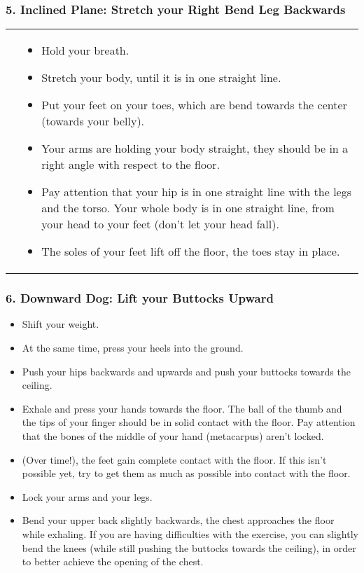 \documentclass[../Book.Stress_regulation.tex]{subfiles}
\begin{document}
\subsubsection{5. Inclined Plane: Stretch your Right Bend Leg Backwards}
\begin{tabular}{p{5.5cm} p{6cm} }
  \raisebox{-1.1\totalheight}{\texttt{[image: SS\_Plank]}}
  &

\begin{itemize}
\item Hold your breath.
\item Stretch your body, until it is in one straight line.
\item Put your feet on your toes, which are bend towards the center (towards your belly).
\item Your arms are holding your body straight, they should be in a right angle with respect to the floor.
\item Pay attention that your hip is in one straight line with the legs and the torso.
  Your whole body is in one straight line, from your head to your feet (don't let your head fall).
\item The soles of your feet lift off the floor, the toes stay in place.
\end{itemize}
\end{tabular}

\subsubsection{6. Downward Dog: Lift your Buttocks Upward}

    
\begin{itemize}
\item Shift your weight.
\item At the same time, press your heels into the ground.
\item Push your hips backwards and upwards and push your buttocks towards the ceiling.
\item Exhale and press your hands towards the floor. The ball of the thumb and the tips of your finger should be in solid contact with the floor.
  Pay attention that the bones of the middle of your hand (metacarpus) aren't locked.
\item (Over time!), the feet gain complete contact with the floor.
  If this isn't possible yet, try to get them as much as possible into contact with the floor.
\item Lock your arms and your legs.
\item Bend your upper back slightly backwards, the chest approaches the floor while exhaling.
  If you are having difficulties with the exercise, you can slightly bend the knees
  (while still pushing the buttocks towards the ceiling), in order to better achieve the opening of the chest.
\end{itemize}
\vspace{-5.5mm}\hspace{-3.5mm}
\end{document}
